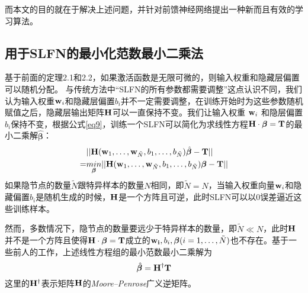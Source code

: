 \documentclass[conference]{IEEEtran}
\begin{document}
而本文的目的就在于解决上述问题，并针对前馈神经网络提出一种新而且有效的学习算法。

\subsection{用于SLFN的最小化范数最小二乘法}

基于前面的定理2.1和2.2，如果激活函数是无限可微的，则输入权重和隐藏层偏置可以随机分配。
与传统方法中“SLFN的所有参数都需要调整”这点认识不同，我们认为输入权重${\bf w}_i$和隐藏层偏置$b_i$并不一定需要调整，在训练开始时为这些参数随机赋值之后，隐藏层输出矩阵${\bf H}$可以一直保持不变。我们让输入权重 ${\bf w}_i$ 和隐层偏置$b_i$保持不变，根据公式\eqref{eq9}，训练一个SLFN可以简化为求线性方程${\bf{H}}\cdot{\bm{\beta}}={\bf{T}}$的最小二乘解$\hat{\bm{\beta}}$：
\begin{equation}\label{eq12}
	\begin{split}
		&||{\bf{H}}({\bf{w}}_1,\dots,{\bf{w}}_{\tilde{N}},b_1,\dots,b_{\tilde{N}})\hat{\bm{\beta}}-{\bf{T}}||\\
		=&\underset{\bm \beta}{min}||{\bf{H}}({\bf{w}}_1,\dots,{\bf{w}}_{\tilde{N}},b_1,\dots,b_{\tilde{N}}){\bm \beta}-{\bf{T}}||
	\end{split}
\end{equation}
如果隐节点的数量$\tilde{N}$跟特异样本的数量$N$相同，即$\tilde{N}=N$，当输入权重向量${\bf w}_i$和隐藏偏置$b_i$是随机生成的时候，${\bf H}$是一个方阵且可逆，此时SLFN可以以0误差逼近这些训练样本。

然而，多数情况下，隐节点的数量要远少于特异样本的数量，即$\tilde{N}\ll N$，此时$\bf H$并不是一个方阵且使得${\bf{H}}\cdot{\bm{\beta}}={\bf{T}}$成立的${\bf{w}_i},b_i,{\bm{\beta}} (i=1,\dots,{\tilde{N}})$也不存在。基于一些前人的工作，上述线性方程组的最小范数最小二乘解为
\begin{equation}\label{eq13}
	\hat {\bm \beta}={\bf H}^{\dagger}{\bf T}
\end{equation}
这里的${\bf H}^{\dagger}$表示矩阵${\bf H}$的\textit{Moore–Penrose}广义逆矩阵。
\end{document}
